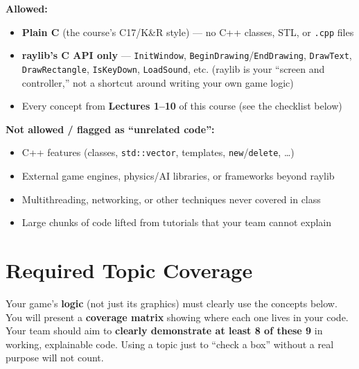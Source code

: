 \documentclass[11pt]{article}
\begin{document}
\begin{minipage}[t]{0.48\textwidth}
\textbf{Allowed:}
\begin{itemize}[leftmargin=*,nosep]
  \item \textbf{Plain C} (the course's C17/K\&R style) --- no C++ classes, STL, or \texttt{.cpp} files
  \item \textbf{raylib's C API only} --- \texttt{InitWindow}, \texttt{BeginDrawing}/\texttt{EndDrawing},
        \texttt{DrawText}, \texttt{DrawRectangle}, \texttt{IsKeyDown}, \texttt{LoadSound}, etc.
        (raylib is your ``screen and controller,'' not a shortcut around writing your own game logic)
  \item Every concept from \textbf{Lectures 1--10} of this course (see the checklist below)
\end{itemize}
\end{minipage}
\hfill
\begin{minipage}[t]{0.48\textwidth}
\textbf{Not allowed / flagged as ``unrelated code'':}
\begin{itemize}[leftmargin=*,nosep]
  \item C++ features (classes, \texttt{std::vector}, templates, \texttt{new}/\texttt{delete}, \ldots)
  \item External game engines, physics/AI libraries, or frameworks beyond raylib
  \item Multithreading, networking, or other techniques never covered in class
  \item Large chunks of code lifted from tutorials that your team cannot explain
\end{itemize}
\end{minipage}

\section*{Required Topic Coverage}

Your game's \textbf{logic} (not just its graphics) must clearly use the concepts below. You will
present a \textbf{coverage matrix} showing where each one lives in your code. Your team should aim
to \textbf{clearly demonstrate at least 8 of these 9} in working, explainable code. Using a topic
just to ``check a box'' without a real purpose will not count.
\end{document}
